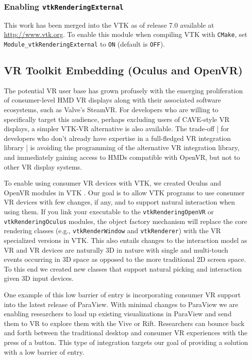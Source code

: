 \subsubsection{Enabling \texttt{vtkRenderingExternal}}

This work has been merged into the VTK as of release 7.0 available at
\url{http://www.vtk.org}.
To enable this module when compiling VTK with \texttt{CMake},
set \texttt{Module\_vtkRenderingExternal} to \texttt{ON} (default is \texttt{OFF}).

\subsection{VR Toolkit Embedding (Oculus and OpenVR)}

The potential VR user base has grown profusely with the emerging
proliferation of consumer-level HMD VR displays along with their associated
software ecosystems, such as Valve's SteamVR.
For developers who are willing to specifically target this audience, perhaps
excluding users of CAVE-style VR displays, a simpler VTK-VR alternative is
also available.
The trade-off | for developers who don't already have expertise in a
full-fledged VR integration library | is avoiding the programming of
the alternative VR integration library, and immediately gaining access
to HMDs compatible with OpenVR, but not to other VR display systems.

To enable using consumer VR devices with VTK, we created Oculus and OpenVR modules in VTK .
Our goal is to allow VTK programs to use consumer VR devices with few changes, if any, and to support natural interaction when using them.
If you link your executable to the \texttt{vtkRenderingOpenVR} or \texttt{vtkRenderingOculus} modules, the object factory
mechanism will replace the core rendering classes (e.g.,
\texttt{vtkRenderWindow} and \texttt{vtkRenderer}) with the VR specialized versions in VTK.  This also entails changes to the 
interaction model as VR and VR devices are naturally 3D in nature with single and multi-touch events occurring in 3D space as 
opposed to the more traditional 2D screen space. To this end we created new classes that support natural picking and interaction given 3D 
input devices.

One example of this low barrier of entry is incorporating consumer VR support into the latest release of ParaView. With minimal changes to ParaView we are enabling researchers to load up existing visualizations in ParaView and send them to VR to explore them with the Vive or Rift. Researchers can bounce back and forth between the traditional desktop and consumer VR experiences with the press of a button. This type of integration targets our goal of providing a solution with a low barrier of entry.

